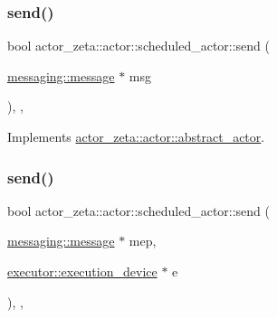 \mbox{\label{classactor__zeta_1_1actor_1_1scheduled__actor_acdd757f48a5233a9914209aaf7a2b5ed}} 
\subsubsection{\texorpdfstring{send()}{send()}\hspace{0.1cm}{\footnotesize\ttfamily [1/2]}}
{\footnotesize\ttfamily bool actor\+\_\+zeta\+::actor\+::scheduled\+\_\+actor\+::send (\begin{DoxyParamCaption}\item[{\hyperlink{classactor__zeta_1_1messaging_1_1message}{messaging\+::message} $\ast$}]{msg }\end{DoxyParamCaption})\hspace{0.3cm}{\ttfamily [final]}, {\ttfamily [override]}, {\ttfamily [virtual]}}



Implements \hyperlink{classactor__zeta_1_1actor_1_1abstract__actor_a9316a5088e53255d74ade831e1fcfb47}{actor\+\_\+zeta\+::actor\+::abstract\+\_\+actor}.

\mbox{\label{classactor__zeta_1_1actor_1_1scheduled__actor_a223d20f327713fa65968f909aacb0a32}} 
\subsubsection{\texorpdfstring{send()}{send()}\hspace{0.1cm}{\footnotesize\ttfamily [2/2]}}
{\footnotesize\ttfamily bool actor\+\_\+zeta\+::actor\+::scheduled\+\_\+actor\+::send (\begin{DoxyParamCaption}\item[{\hyperlink{classactor__zeta_1_1messaging_1_1message}{messaging\+::message} $\ast$}]{mep,  }\item[{\hyperlink{structactor__zeta_1_1executor_1_1execution__device}{executor\+::execution\+\_\+device} $\ast$}]{e }\end{DoxyParamCaption})\hspace{0.3cm}{\ttfamily [final]}, {\ttfamily [override]}, {\ttfamily [virtual]}}



